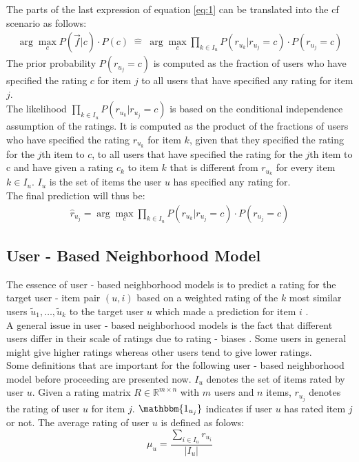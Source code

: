 The parts of the last expression of equation \eqref{eq:1} can be translated into the \acrshort{cf} scenario as follows:
\begin{equation}
    \begin{align*}
        \arg\max_{c} P(\Vec{f}|c)\cdot P(c) \;\widehat{=}\; \arg\max_{c} \prod\limits_{k \in I_u} P(r_{u_k}|r_{u_j}=c) \cdot P(r_{u_j} = c)
    \end{align*}
\end{equation}
The prior probability $P(r_{u_j} = c)$ is computed as the fraction of users who have specified the rating $c$ for item $j$ to all users that have specified any rating for item $j$.\\
The likelihood $\prod\limits_{k \in I_u} P(r_{u_k}|r_{u_j}=c)$ is based on the conditional independence assumption of the ratings. %
It is computed as the product of the fractions of users who have specified the rating $r_u_k$ for item $k$, given that they specified the rating for the $j$th item to $c$, to all users that have specified the rating for the $j$th item to c and have given a rating $c_k$ to item $k$ that is different from $r_{u_k}$ for every item $k \in I_u$. $I_u$ is the set of items the user $u$ has specified any rating for.\\
The final prediction will thus be:
\begin{equation}
    \begin{align*}
        \hat{r}_{u_j} = \arg\max_{c} \prod\limits_{k \in I_u} P(r_{u_k}|r_{u_j}=c) \cdot P(r_{u_j} = c)
    \end{align*}
\end{equation}

\subsection{User - Based Neighborhood Model}
The essence of user - based neighborhood models is to predict a rating for the target user - item pair $(u,i)$ based on a weighted rating of the $k$ most similar users $\tilde{u}_1, \dots ,\tilde{u}_k$ to the target user $u$ which made a prediction for item $i$ \cite{aggarwal2016recommender}. \\ 
A general issue in user - based neighborhood models is the fact that different users differ in their scale of ratings due to rating - biases \cite{wherry1982control}. Some users in general might give higher ratings whereas other users tend to give lower ratings.\\
Some definitions that are important for the following user - based neighborhood model before proceeding are presented now.
$I_u$ denotes the set of items rated by user $u$. Given a rating matrix $R \in \mathbb{R}^{m \times n}$ with $m$ users and $n$ items, $r_u_j$ denotes the rating of user $u$ for item $j$. $\mathbbm{1_{u_j}}$ indicates if user $u$ has rated item $j$ or not. The average rating of user $u$ is defined as folows:
    \begin{equation}
    \mu_u = \frac{\sum\limits_{i \in I_u}r_u_i}{|I_u|}
    \end{equation}

